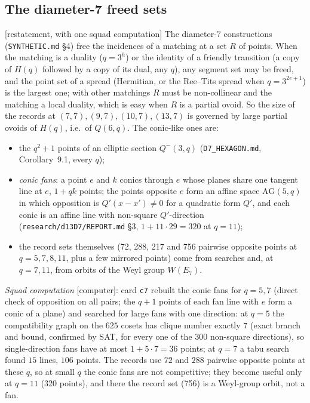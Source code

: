 \documentclass[11pt]{amsart}
\theoremstyle{definition}
\theoremstyle{remark}
\newcommand{\status}[1]{\textup{[#1]}}
\begin{document}
\subsection{The diameter-7 freed sets}
\status{restatement, with one squad computation} The diameter-$7$ constructions (\texttt{SYNTHETIC.md} \S4) free the
incidences of a matching at a set $R$ of points. When the matching is a duality ($q=3^h$) or the identity of a friendly
transition (a copy of $H(q)$ followed by a copy of its dual, any $q$), any segment set may be freed, and the point
set of a spread (Hermitian, or the Ree--Tits spread when $q=3^{2e+1}$) is the largest one; with other matchings
$R$ must be non-collinear and the matching a local duality, which is easy when $R$ is a partial ovoid. So the
size of the records at $(7,7),(9,7),(10,7),(13,7)$ is governed by large partial ovoids of $H(q)$, i.e.\ of $Q(6,q)$.
The conic-like ones are:
\begin{itemize}
\item the $q^2+1$ points of an elliptic section $Q^-(3,q)$ (\texttt{D7\_HEXAGON.md}, Corollary~9.1, every $q$);
\item \emph{conic fans}: a point $e$ and $k$ conics through $e$ whose planes share one tangent line at $e$, $1+qk$
points; the points opposite $e$ form an affine space $\mathrm{AG}(5,q)$ in which opposition is $Q'(x-x')\ne0$ for a
quadratic form $Q'$, and each conic is an affine line with non-square $Q'$-direction (\texttt{research/d13D7/REPORT.md}
\S3, $1+11\cdot29=320$ at $q=11$);
\item the record sets themselves (72, 288, 217 and 756 pairwise opposite points at $q=5,7,8,11$, plus a few
mirrored points) come from searches and, at $q=7,11$, from orbits of the Weyl group $W(E_7)$.
\end{itemize}
\emph{Squad computation} \status{computer}: card \texttt{c7} rebuilt the conic fans for $q=5,7$ (direct check of
opposition on all pairs; the $q+1$ points of each fan line with $e$ form a conic of a plane) and searched for large
fans with one direction: at $q=5$ the compatibility graph on the $625$ cosets has clique number exactly $7$ (exact
branch and bound, confirmed by SAT, for every one of the $300$ non-square directions), so single-direction fans have
at most $1+5\cdot7=36$ points; at $q=7$ a tabu search found $15$ lines, $106$ points. The records use $72$ and $288$
pairwise opposite points at these $q$, so at small $q$ the conic fans are not competitive; they become useful only at
$q=11$ (320 points), and there the record set (756) is a Weyl-group orbit, not a fan.
\end{document}
